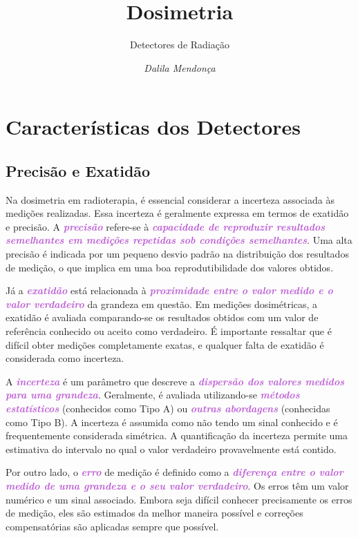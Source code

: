 \documentclass[11pt,a4paper]{article}
\title{\LobsterTwo\Huge{Dosimetria}}
\author{\LobsterTwo\Large{Detectores de Radiação\nocite{*}}}
\date{\LobsterTwo\textit{Dalila Mendonça}}
\begin{document}
	\maketitle

\section{Características dos Detectores}

\subsection*{Precisão e Exatidão}

	Na dosimetria em radioterapia, é essencial considerar a incerteza associada às medições realizadas. Essa incerteza é geralmente expressa em termos de exatidão e precisão. A \textcolor{MediumOrchid}{\textit{\textbf{precisão}}} refere-se à \textcolor{MediumOrchid}{\textit{\textbf{capacidade de reproduzir resultados semelhantes em medições repetidas sob condições semelhantes}}}. Uma alta precisão é indicada por um pequeno desvio padrão na distribuição dos resultados de medição, o que implica em uma boa reprodutibilidade dos valores obtidos.

	Já a \textcolor{MediumOrchid}{\textit{\textbf{exatidão}}} está relacionada à \textcolor{MediumOrchid}{\textit{\textbf{proximidade entre o valor medido e o valor verdadeiro}}} da grandeza em questão. Em medições dosimétricas, a exatidão é avaliada comparando-se os resultados obtidos com um valor de referência conhecido ou aceito como verdadeiro. É importante ressaltar que é difícil obter medições completamente exatas, e qualquer falta de exatidão é considerada como incerteza.

	A \textcolor{MediumOrchid}{\textit{\textbf{incerteza}}} é um parâmetro que descreve a \textcolor{MediumOrchid}{\textit{\textbf{dispersão dos valores medidos para uma grandeza}}}. Geralmente, é avaliada utilizando-se \textcolor{MediumOrchid}{\textit{\textbf{métodos estatísticos}}} (conhecidos como Tipo A) ou \textcolor{MediumOrchid}{\textit{\textbf{outras abordagens}}} (conhecidas como Tipo B). A incerteza é assumida como não tendo um sinal conhecido e é frequentemente considerada simétrica. A quantificação da incerteza permite uma estimativa do intervalo no qual o valor verdadeiro provavelmente está contido.

	Por outro lado, o \textcolor{MediumOrchid}{\textit{\textbf{erro}}} de medição é definido como a \textcolor{MediumOrchid}{\textit{\textbf{diferença entre o valor medido de uma grandeza e o seu valor verdadeiro}}}. Os erros têm um valor numérico e um sinal associado. Embora seja difícil conhecer precisamente os erros de medição, eles são estimados da melhor maneira possível e correções compensatórias são aplicadas sempre que possível.
\end{document}

